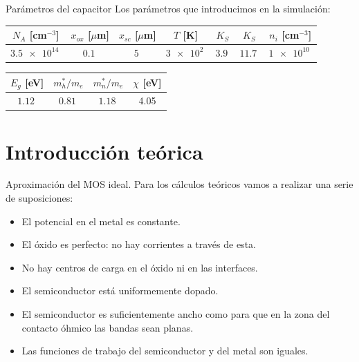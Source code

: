 \documentclass{/home/daniel/GitHub/USC-Physics-Degree-Notes/Notes/Presentacion}
\begin{document}
\begin{frame}{Parámetros del capacitor}
    Los parámetros que introducimos en la simulación: 
    \begin{center} 
        \begin{tabular}{ccccccc} \toprule
            $N_A$ [cm$^{-3}$] & $x_{ox}$ [$\mu$m] & $x_{sc}$  [$\mu$m] & $T$ [K] & $K_{S}$ & $K_S$ & $n_i$  [cm$^{-3}$] \\ \midrule
            $\SI{3.5e+14}{}$ & $\SI{0.1}{}$ & $\SI{5}{}$ & $\SI{3e+2}{}$ & $\SI{3.9}{}$ & $\SI{11.7}{}$ & $\SI{1e+10}{}$ \\ \bottomrule 
        \end{tabular}
    \end{center}
    \begin{center} 
        \begin{tabular}{cccc} \toprule
            $E_g$ [eV] & $m_h^*/m_e$ &$m_n^*/m_e$ & $\chi$  [eV]\\ \midrule
            $\SI{1.12}{}$ & $\SI{0.81}{}$ & $\SI{1.18}{}$ & 4.05  \\ \bottomrule 
        \end{tabular}
    \end{center}
\end{frame}


\section{Introducción teórica}
\begin{frame}{Aproximación del MOS ideal.}
    Para los cálculos teóricos vamos a realizar una serie de suposiciones:

    \begin{itemize}
        \item El potencial en el metal es constante.
        \item El óxido es perfecto: no hay corrientes a través de esta.
        \item No hay centros de carga en el óxido ni en las interfaces. 
        \item El semiconductor está uniformemente dopado. 
        \item El semiconductor es suficientemente ancho como para que en la zona del contacto óhmico las bandas sean planas.
        \item Las funciones de trabajo del semiconductor y del metal son iguales.
    \end{itemize}
\end{frame}
\end{document}
